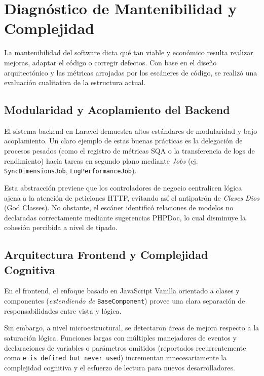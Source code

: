 \section{Diagnóstico de Mantenibilidad y Complejidad}

La mantenibilidad del software dicta qué tan viable y económico resulta realizar mejoras, adaptar el código o corregir defectos. Con base en el diseño arquitectónico y las métricas arrojadas por los escáneres de código, se realizó una evaluación cualitativa de la estructura actual.

\subsection{Modularidad y Acoplamiento del Backend}

El sistema backend en Laravel demuestra altos estándares de modularidad y bajo acoplamiento. Un claro ejemplo de estas buenas prácticas es la delegación de procesos pesados (como el registro de métricas SQA o la transferencia de logs de rendimiento) hacia tareas en segundo plano mediante \textit{Jobs} (ej. \texttt{SyncDimensionsJob}, \texttt{LogPerformanceJob}). 

Esta abstracción previene que los controladores de negocio centralicen lógica ajena a la atención de peticiones HTTP, evitando así el antipatrón de \textit{Clases Dios} (God Classes). No obstante, el escáner identificó relaciones de modelos no declaradas correctamente mediante sugerencias PHPDoc, lo cual disminuye la cohesión percibida a nivel de tipado.

\subsection{Arquitectura Frontend y Complejidad Cognitiva}

En el frontend, el enfoque basado en JavaScript Vanilla orientado a clases y componentes (\textit{extendiendo de} \texttt{BaseComponent}) provee una clara separación de responsabilidades entre vista y lógica.

Sin embargo, a nivel microestructural, se detectaron áreas de mejora respecto a la saturación lógica. Funciones largas con múltiples manejadores de eventos y declaraciones de variables o parámetros omitidos (reportados recurrentemente como \texttt{e is defined but never used}) incrementan innecesariamente la complejidad cognitiva y el esfuerzo de lectura para nuevos desarrolladores.

